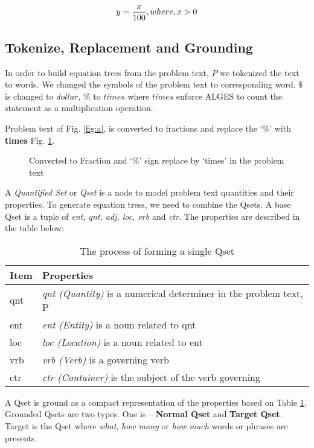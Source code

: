 \documentclass[document.tex]{subfiles}
\begin{document}
\begin{equation}
	y = {x \over 100}, where, x>0
	\label{eq:conv}
\end{equation}

\subsection{Tokenize, Replacement and Grounding}
\noindent In order to build equation trees from the problem text, $P$ we tokenized the text to words. We changed the symbols of the problem text to corresponding word. $\$$ is changed to $dollar$, $\%$ to $times$ where $times$ enforce ALGES to count the statement as a multiplication operation.

Problem text of Fig. \ref{fig:a}, is converted to fractions and replace the ‘\%’ with \textbf{times} Fig. \ref{fig:conv}.
\begin{figure}[H]
	
	\caption{Converted to Fraction and ‘\%’ sign replace by ‘times’ in the problem text}
	\label{fig:conv}
\end{figure}

A \textit{Quantified Set} or \textit{Qset} is a node to model problem text quantities and their properties. To generate equation tress, we need to combine the Qsets. A base Qset is a tuple of \textit{ent, qnt, adj, loc, vrb} and \textit{ctr}. The properties are described in the table below:
\begin{table}[H]
	\caption{The process of forming a single Qset\cite{3}}
	\begin{center}
		\begin{tabular}{|l|l|}\hline
			Item & Properties          \\ \hline
			qnt  & \textit{qnt (Quantity)} is a numerical determiner in the problem text, P \\ \hline
			
			ent  & \textit{ent (Entity)} is a noun related to qnt \\ \hline
			loc  & \textit{loc (Location)} is a noun related to ent \\ \hline
			vrb  & \textit{vrb (Verb)} is a governing verb \\ \hline
			ctr  & \textit{ctr (Container)} is the subject of the verb governing \\ \hline
		\end{tabular}
	\end{center}
	\label{tab:qset}
\end{table}
A Qset is ground as a compact representation of the properties based on Table \ref{tab:qset}. Grounded Qsets are two types. One is – \textbf{Normal Qset} and \textbf{Target Qset}. Target is the Qset where \textit{what}, \textit{how many} or \textit{how much} words or phrases are presents.
\end{document}
